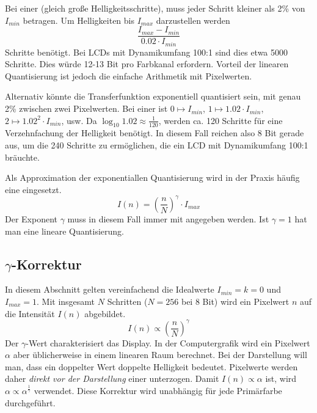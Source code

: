 Bei einer  (gleich große Helligkeitsschritte), muss jeder Schritt kleiner als 2\% von $I_{min}$ betragen.
Um Helligkeiten bis $I_{max}$ darzustellen werden
\[
	\frac{I_{max} - I_{min}}{0.02 \cdot I_{min}}
\]
Schritte benötigt.
Bei LCDs mit Dynamikumfang 100:1 sind dies etwa 5000 Schritte.
Dies würde 12-13 Bit pro Farbkanal erfordern.
Vorteil der linearen Quantisierung ist jedoch die einfache Arithmetik mit Pixelwerten.

Alternativ könnte die Transferfunktion exponentiell quantisiert sein, mit genau 2\% zwischen zwei Pixelwerten.
Bei einer  ist $0 \mapsto I_{min}$, $1 \mapsto 1.02 \cdot I_{min}$, $2 \mapsto 1.02^2 \cdot I_{min}$, usw.
Da $\log_{10} 1.02 \approx \frac{1}{120}$, werden ca. 120 Schritte für eine Verzehnfachung der Helligkeit benötigt.
In diesem Fall reichen also 8 Bit gerade aus, um die 240 Schritte zu ermöglichen, die ein LCD mit Dynamikumfang 100:1 bräuchte.

Als Approximation der exponentiallen Quantisierung wird in der Praxis häufig eine  eingesetzt.
\[
	I(n) = \left(\frac{n}{N}\right)^\gamma \cdot I_{max}
\]
Der Exponent $\gamma$ muss in diesem Fall immer mit angegeben werden.
Ist $\gamma = 1$ hat man eine lineare Quantisierung.

\subsection{$\gamma$-Korrektur}
In diesem Abschnitt gelten vereinfachend die Idealwerte $I_{min} = k = 0$ und $I_{max} = 1$.
Mit insgesamt $N$ Schritten ($N = 256$ bei $8$ Bit) wird ein Pixelwert $n$ auf die Intensität $I(n)$ abgebildet.
\[
	I(n) \propto \left(\frac{n}{N}\right)^\gamma
\]
Der $\gamma$-Wert charakterisiert das Display.
In der Computergrafik wird ein Pixelwert $\alpha$ aber üblicherweise in einem linearen Raum berechnet.
Bei der Darstellung will man, dass ein doppelter Wert doppelte Helligkeit bedeutet.
Pixelwerte werden daher \emph{direkt vor der Darstellung} einer  unterzogen.
Damit $I(n) \propto \alpha$ ist, wird $\alpha \propto \alpha^{\frac{1}{\gamma}}$ verwendet.
Diese Korrektur wird unabhängig für jede Primärfarbe durchgeführt.
